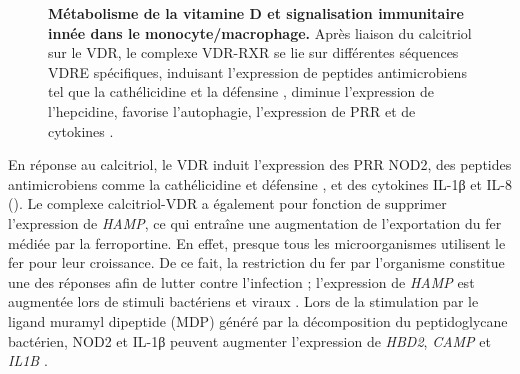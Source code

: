 \documentclass[
  a4paper,
  DIV=11,
  numbers=noendperiod,
  listof=totoc]{scrreprt}
\begin{document}
\begin{figure}


\caption[Métabolisme de la vitamine D et signalisation immunitaire innée
dans le
monocyte/macrophage.]{\label{fig-vd-immune-signaling}\textbf{Métabolisme
de la vitamine D et signalisation immunitaire innée dans le
monocyte/macrophage.} Après liaison du calcitriol sur le VDR, le
complexe VDR-RXR se lie sur différentes séquences \ac{VDRE} spécifiques,
induisant l'expression de peptides antimicrobiens tel que la
cathélicidine et la défensine , diminue l'expression de
l'hepcidine, favorise l'autophagie, l'expression de PRR et de cytokines
\autocite{Ismailova.2022}.}

\end{figure}%

En réponse au calcitriol, le \ac{VDR} induit l'expression des \ac{PRR}
NOD2, des peptides antimicrobiens comme la cathélicidine et défensine
, et des cytokines IL-1β et IL-8
(). Le complexe calcitriol-VDR a également
pour fonction de supprimer l'expression de \emph{HAMP}, ce qui entraîne
une augmentation de l'exportation du fer médiée par la ferroportine. En
effet, presque tous les microorganismes utilisent le fer pour leur
croissance. De ce fait, la restriction du fer par l'organisme constitue
une des réponses afin de lutter contre l'infection ; l'expression de
\emph{HAMP} est augmentée lors de stimuli bactériens et viraux
\autocite{Bishop.2021}. Lors de la stimulation par le ligand muramyl
dipeptide (MDP) généré par la décomposition du peptidoglycane bactérien,
NOD2 et IL-1β peuvent augmenter l'expression de \emph{HBD2}, \emph{CAMP}
et \emph{IL1B} \autocite{Bishop.2021}.
\end{document}

